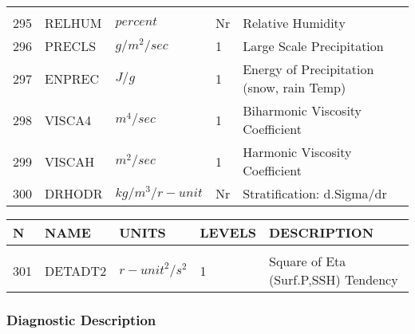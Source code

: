 \begin{tabular}{lllll}
\begin{minipage}[t]{3in}
         \end{minipage}\\
295& RELHUM   & $percent$ & Nr
         &\begin{minipage}[t]{3in}
          {Relative Humidity} 
         \end{minipage}\\
296& PRECLS   & $g/m^2/sec$ & 1
         &\begin{minipage}[t]{3in}
          {Large Scale Precipitation} 
         \end{minipage}\\
297& ENPREC   & $J/g$ & 1
         &\begin{minipage}[t]{3in}
          {Energy of Precipitation (snow, rain Temp)} 
         \end{minipage}\\
298& VISCA4   & $m^4/sec$ & 1
         &\begin{minipage}[t]{3in}
          {Biharmonic Viscosity Coefficient} 
         \end{minipage}\\
299& VISCAH   & $m^2/sec$ & 1
         &\begin{minipage}[t]{3in}
          {Harmonic Viscosity Coefficient} 
         \end{minipage}\\
300& DRHODR   & $kg/m^3/{r-unit}$ & Nr
         &\begin{minipage}[t]{3in}
          {Stratification: d.Sigma/dr} 
         \end{minipage}\\
\end{tabular}
\vspace{1.5in}
\vfill

\newpage
\vspace*{\fill}
\begin{tabular}{lllll}
\hline\hline
N & NAME & UNITS & LEVELS & DESCRIPTION \\
\hline

&\\
301& DETADT2  & ${r-unit}^2/s^2$ & 1
         &\begin{minipage}[t]{3in}
          {Square of Eta (Surf.P,SSH) Tendency} 
         \end{minipage}\\
\end{tabular}
\vspace{1.5in}
\vfill

\newpage

\subsubsection{Diagnostic Description}

